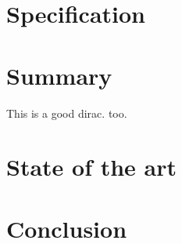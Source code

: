 \documentclass[paper=a4, fontsize=11pt]{scrartcl}
\begin{document}

\newpage

\section{Specification}
\newpage

\renewcommand{\contentsname}{Table of contents}
\tableofcontents
\newpage

\section{Summary}
This \cite{dirac} is a good dirac. \cite{einstein} too.
\newpage


\newpage

\section{State of the art}

\section{Conclusion}

\printbibliography[heading=bibintoc, title={Bibliography}]
\newpage



\listoffigures

\listoftables


\end{document}
